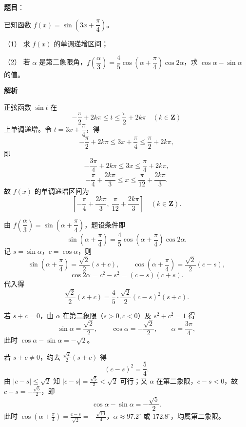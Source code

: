 \begin{answer}

\textbf{题目}：

已知函数 $f(x)=\sin\left(3x+\dfrac\pi4\right)$。

（1） 求 $f(x)$ 的单调递增区间；

（2） 若 $\alpha$ 是第二象限角，$f\left(\dfrac\alpha3\right)=\dfrac45\cos\left(\alpha+\dfrac\pi4\right)\cos 2\alpha$，求 $\cos\alpha-\sin\alpha$ 的值。

\textbf{解析}


正弦函数 $\sin t$ 在
\nopagebreak[4]
\[-\frac\pi2+2k\pi\leqslant t\leqslant\frac\pi2+2k\pi\quad(k\in\mathbf Z)\]
上单调递增。令 $t=3x+\dfrac\pi4$，得
\nopagebreak[4]
\[-\frac\pi2+2k\pi\leqslant 3x+\frac\pi4\leqslant\frac\pi2+2k\pi,\]
即
\nopagebreak[4]
\[-\frac{3\pi}4+2k\pi\leqslant 3x\leqslant\frac\pi4+2k\pi,\]
\nopagebreak[4]
\[-\frac\pi4+\frac{2k\pi}3\leqslant x\leqslant\frac\pi{12}+\frac{2k\pi}3 .\]
故 $f(x)$ 的单调递增区间为
\nopagebreak[4]
\[\left[-\frac\pi4+\frac{2k\pi}3,\ \frac\pi{12}+\frac{2k\pi}3\right]\quad(k\in\mathbf Z).\]


由 $f\left(\dfrac\alpha3\right)=\sin\left(\alpha+\dfrac\pi4\right)$，题设条件即
\nopagebreak[4]
\[\sin\left(\alpha+\frac\pi4\right)=\frac45\cos\left(\alpha+\frac\pi4\right)\cos2\alpha .\]
记 $s=\sin\alpha$，$c=\cos\alpha$，则
\nopagebreak[4]
\[\sin\left(\alpha+\frac\pi4\right)=\frac{\sqrt2}2(s+c),\qquad
\cos\left(\alpha+\frac\pi4\right)=\frac{\sqrt2}2(c-s),\]
\nopagebreak[4]
\[\cos2\alpha=c^2-s^2=(c-s)(c+s).\]
代入得
\nopagebreak[4]
\[\frac{\sqrt2}2(s+c)=\frac45\cdot\frac{\sqrt2}2(c-s)^2(s+c).\]

若 $s+c=0$，由 $\alpha$ 在第二象限（$s>0,c<0$）及 $s^2+c^2=1$ 得
\nopagebreak[4]
\[\sin\alpha=\frac{\sqrt2}2,\qquad \cos\alpha=-\frac{\sqrt2}2,\qquad \alpha=\frac{3\pi}4,\]
此时 $\cos\alpha-\sin\alpha=-\sqrt2$。

若 $s+c\neq0$，约去 $\frac{\sqrt2}2(s+c)$ 得
\nopagebreak[4]
\[(c-s)^2=\frac54 .\]
由 $|c-s|\leqslant\sqrt2$ 知 $|c-s|=\frac{\sqrt5}2<\sqrt2$ 可行；又 $\alpha$ 在第二象限，$c-s<0$，故 $c-s=-\frac{\sqrt5}2$，即
\nopagebreak[4]
\[\cos\alpha-\sin\alpha=-\frac{\sqrt5}2 .\]
此时 $\cos\left(\alpha+\frac\pi4\right)=\frac{c-s}{\sqrt2}=-\frac{\sqrt{10}}4$，$\alpha\approx97.2^\circ$ 或 $172.8^\circ$，均属第二象限。


\end{answer}
